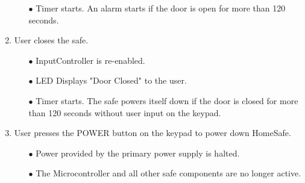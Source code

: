 \documentclass{article}
\begin{document}
\begin{enumerate}
\begin{enumerate}
        \item[$\bullet$] Timer starts. An alarm starts if the door is open for more than 120 seconds.
    \end{enumerate}
    \item User closes the safe.
    \begin{enumerate}
        \item[$\bullet$] InputController is re-enabled.
        \item[$\bullet$] LED Displays "Door Closed" to the user.
        \item[$\bullet$] Timer starts. The safe powers itself down if the door is closed for more than 120 seconds without user input on the keypad.
    \end{enumerate}
    \item User presses the POWER button on the keypad to power down HomeSafe.
    \begin{enumerate}
        \item[$\bullet$] Power provided by the primary power supply is halted.
        \item[$\bullet$] The Microcontroller and all other safe components are no longer active.
    \end{enumerate}

\end{enumerate}

\newpage

\printbibliography

{\parindent0pt}
\end{document}
